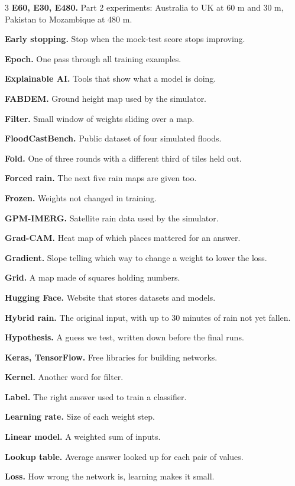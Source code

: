 \begin{multicols}{3}
\textbf{E60, E30, E480.} Part 2 experiments: Australia to UK at 60 m and 30 m, Pakistan to Mozambique at 480 m.\par
\textbf{Early stopping.} Stop when the mock-test score stops improving.\par
\textbf{Epoch.} One pass through all training examples.\par
\textbf{Explainable AI.} Tools that show what a model is doing.\par
\textbf{FABDEM.} Ground height map used by the simulator.\par
\textbf{Filter.} Small window of weights sliding over a map.\par
\textbf{FloodCastBench.} Public dataset of four simulated floods.\par
\textbf{Fold.} One of three rounds with a different third of tiles held out.\par
\textbf{Forced rain.} The next five rain maps are given too.\par
\textbf{Frozen.} Weights not changed in training.\par
\textbf{GPM-IMERG.} Satellite rain data used by the simulator.\par
\textbf{Grad-CAM.} Heat map of which places mattered for an answer.\par
\textbf{Gradient.} Slope telling which way to change a weight to lower the loss.\par
\textbf{Grid.} A map made of squares holding numbers.\par
\textbf{Hugging Face.} Website that stores datasets and models.\par
\textbf{Hybrid rain.} The original input, with up to 30 minutes of rain not yet fallen.\par
\textbf{Hypothesis.} A guess we test, written down before the final runs.\par
\textbf{Keras, TensorFlow.} Free libraries for building networks.\par
\textbf{Kernel.} Another word for filter.\par
\textbf{Label.} The right answer used to train a classifier.\par
\textbf{Learning rate.} Size of each weight step.\par
\textbf{Linear model.} A weighted sum of inputs.\par
\textbf{Lookup table.} Average answer looked up for each pair of values.\par
\textbf{Loss.} How wrong the network is, learning makes it small.\par

\end{multicols}
